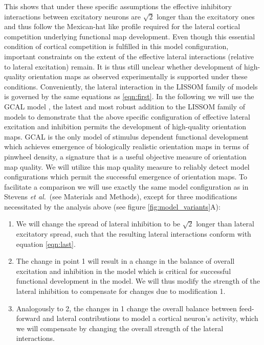 \documentclass[utf8]{frontiersSCNS}
\newcommand{\etal}{\textit{et al.}}
\begin{document}
This shows that under these specific assumptions the effective inhibitory interactions between excitatory neurons are $\sqrt{2}$ longer than the excitatory ones and thus follow the Mexican-hat like profile required for the lateral cortical competition underlying functional map development. Even though this essential condition of cortical competition is fulfilled in this model configuration, important constraints on the extent of the effective lateral
interactions (relative to lateral excitation) remain. It is thus still unclear whether development of high-quality orientation maps as observed experimentally is supported under these conditions. Conveniently, the lateral interaction in the LISSOM family of models is governed by the same equations as \ref{eqn:first}. In the following we will use the GCAL model \citep{Stevens2013}, the latest and most robust addition to the LISSOM family of models to demonstrate that the above specific configuration of effective lateral excitation and inhibition permits the development of high-quality orientation maps. GCAL is the only model of stimulus dependent functional development which achieves emergence of biologically realistic 
orientation maps in terms of pinwheel density, a signature that is a useful objective measure of orientation map quality. We will utilize this
map quality measure to reliably detect model configurations which permit the successful emergence of orientation maps.
To facilitate a comparison we will use exactly the same model configuration 
as in Stevens \etal\,\citep{Stevens2013} (see Materials and Methods), except for three modifications necessitated by the analysis above (see figure \ref{fig:model_variants}A):

\begin{enumerate}

\item We will change the spread of lateral inhibition to be $\sqrt{2}$ longer than lateral excitatory spread, such that the resulting lateral
interactions conform with equation \ref{eqn:last}.

\item The change in point 1 will result in a change in the balance of overall excitation and inhibition in the model which is critical 
for successful functional development in the model. We will thus modify the strength of the lateral inhibition to compensate for changes due to modification 1.

\item Analogously to 2, the changes in 1 change the overall balance between feed-forward and lateral contributions to model a cortical neuron's activity, 
which we will compensate by changing the overall strength of the lateral interactions.

\end{enumerate} 
\end{document}
